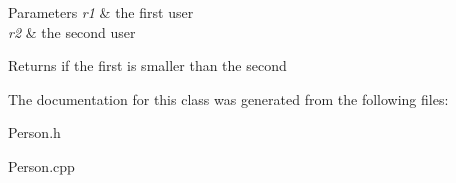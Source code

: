 \begin{DoxyParams}{Parameters}
{\em r1} & the first user \\
\hline
{\em r2} & the second user \\
\hline
\end{DoxyParams}
\begin{DoxyReturn}{Returns}
if the first is smaller than the second 
\end{DoxyReturn}


The documentation for this class was generated from the following files\+:\begin{DoxyCompactItemize}
\item 
Person.\+h\item 
Person.\+cpp\end{DoxyCompactItemize}
